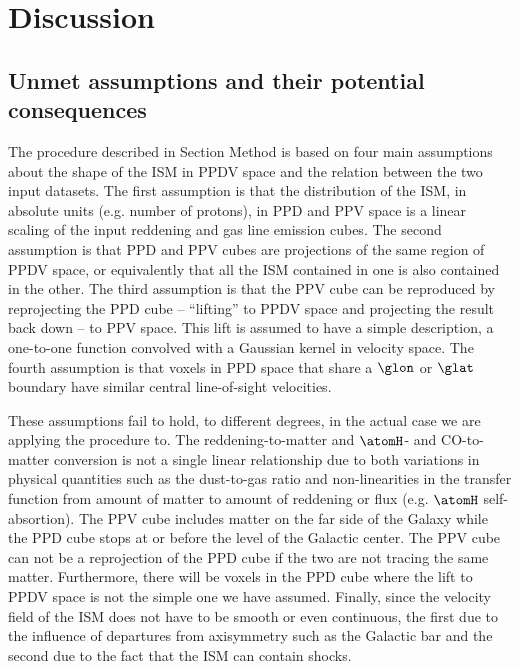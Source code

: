 \section{Discussion}
\label{sec:discussion}

\subsection{Unmet assumptions and their potential consequences}
\label{sec:discussion-systematics}


The procedure described in Section Method is based on four main assumptions about the shape of the ISM in PPDV space and the relation between the two input datasets.
The first assumption is that the distribution of the ISM, in absolute units (e.g. number of protons), in PPD and PPV space is a linear scaling of the input reddening and gas line emission cubes.
The second assumption is that PPD and PPV cubes are projections of the same region of PPDV space, or equivalently that all the ISM contained in one is also contained in the other.
The third assumption is that the PPV cube can be reproduced by reprojecting the PPD cube -- ``lifting'' to PPDV space and projecting the result back down -- to PPV space.
This lift is assumed to have a simple description, a one-to-one function convolved with a Gaussian kernel in velocity space.
The fourth assumption is that voxels in PPD space that share a $\glon$ or $\glat$ boundary have similar central line-of-sight velocities.

These assumptions fail to hold, to different degrees, in the actual case we are applying the procedure to. 
The reddening-to-matter and $\atomH$- and CO-to-matter conversion is not a single linear relationship due to both variations in physical quantities such as the dust-to-gas ratio and non-linearities in the transfer function from amount of matter to amount of reddening or flux (e.g. $\atomH$ self-absortion). 
The PPV cube includes matter on the far side of the Galaxy while the PPD cube stops at or before the level of the Galactic center.
The PPV cube can not be a reprojection of the PPD cube if the two are not tracing the same matter. 
Furthermore, there will be voxels in the PPD cube where the lift to PPDV space is not the simple one we have assumed.
Finally, since the velocity field of the ISM does not have to be smooth or even continuous, the first due to the influence of departures from axisymmetry such as the Galactic bar and the second due to the fact that the ISM can contain shocks.

